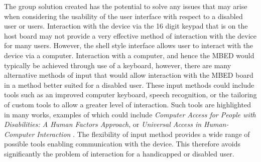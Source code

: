 The group solution created has the potential to solve any issues that may arise 
when considering the usability of the user interface with respect to a disabled 
user or users. Interaction with the device via the 16 digit keypad that is on 
the host board may not provide a very effective method of interaction with the 
device for many users. However, the shell style interface allows user to interact 
with the device via a computer. Interaction with a computer, and hence the MBED 
would typically be achieved through use of a keyboard, however, there are many 
alternative methods of input that would allow interaction with the MBED board in 
a method better suited for a disabled user. These input methods could include 
tools such as an improved computer keyboard, speech recognition, or the tailoring 
of custom tools to allow a greater level of interaction. Such tools are 
highlighted in many works, examples of which could include \textit{Computer Access for People with 
Disabilities: A Human Factors Approach}, or \textit{Universal Access in 
Human-Computer Interaction} \cite{disabled-book, disabled-book2}. The flexibility of 
input method provides a wide range of possible tools enabling communication with 
the device. This therefore avoids significantly the problem of interaction for 
a handicapped or disabled user. 
